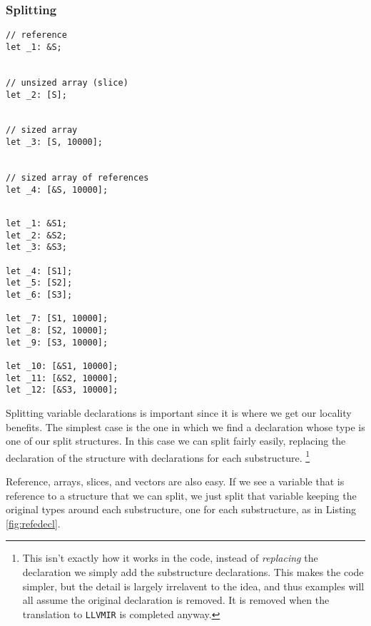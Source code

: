 \documentclass[prodmode,acmtecs]{acmsmall} %
\newcommand{\llvmirname}{{\texttt{LLVMIR}}}
\def \llvmir {\llvmirname{}\xspace}
\begin{document}
\subsubsection{Splitting}
\label{sec:splitting}
\begin{figure*}
  \begin{minipage}[t]{0.5\linewidth}
    \begin{verbatim}
// reference
let _1: &S;


// unsized array (slice)
let _2: [S];


// sized array
let _3: [S, 10000];


// sized array of references
let _4: [&S, 10000];


\end{verbatim}
\end{minipage}
\begin{minipage}[t]{0.5\linewidth}
\begin{verbatim}
let _1: &S1;
let _2: &S2;
let _3: &S3;

let _4: [S1];
let _5: [S2];
let _6: [S3];

let _7: [S1, 10000];
let _8: [S2, 10000];
let _9: [S3, 10000];

let _10: [&S1, 10000];
let _11: [&S2, 10000];
let _12: [&S3, 10000];
\end{verbatim}
\end{minipage}


  \caption{Reference and Array Splitting $g = 3$}
  \label{fig:refedecl}
\end{figure*}
Splitting variable declarations is important since it is where
we get our locality benefits.  The simplest case is the one in which
we find a declaration whose type is one of our split structures. In this 
case we can split fairly easily, replacing the declaration of the structure with
declarations for each substructure.  
\footnote{This isn't exactly how it works in the code, instead of 
  \textit{replacing} the declaration we simply add the 
  substructure declarations.  This makes the code simpler, 
  but the detail is largely irrelavent to the
  idea, and thus examples will all assume the original declaration is removed.
  It is removed when the translation to \llvmir is completed anyway.}

Reference, arrays, slices, and vectors are also easy. 
If we see a variable that is reference to a structure 
that we can split, we just split that variable keeping the original
types around each substructure, 
one for each substructure, as in Listing \ref{fig:refedecl}.
\end{document}
